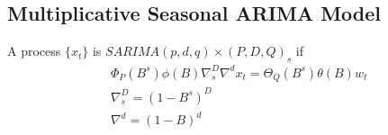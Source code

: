 \subsection{Multiplicative Seasonal ARIMA Model}
A process $\{ x_t \}$ is $SARIMA(p,d,q) \times (P,D,Q)_s$ if 
    \begin{align*}
        & \Phi_P(B^s) \phi(B) \nabla_s^D \nabla^d x_t = \Theta_Q(B^s) \theta(B) w_t\\
        & \nabla_s^D = (1 - B^s)^D \tag{Seasonal Differencing} \\
        & \nabla^d = (1-B)^d
    \end{align*}